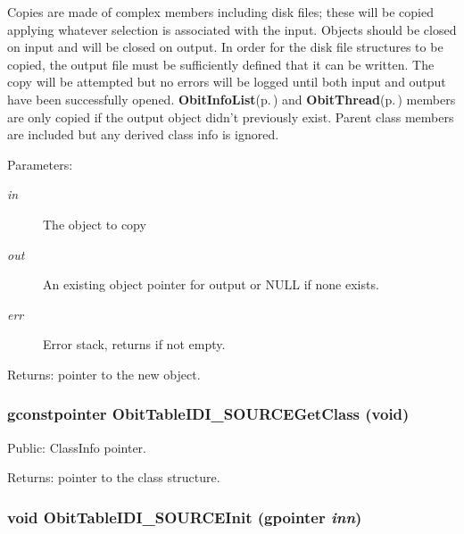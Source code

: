Copies are made of complex members including disk files; these will be copied applying whatever selection is associated with the input. Objects should be closed on input and will be closed on output. In order for the disk file structures to be copied, the output file must be sufficiently defined that it can be written. The copy will be attempted but no errors will be logged until both input and output have been successfully opened. {\bf Obit\-Info\-List}{\rm (p.\,\pageref{structObitInfoList})} and {\bf Obit\-Thread}{\rm (p.\,\pageref{structObitThread})} members are only copied if the output object didn't previously exist. Parent class members are included but any derived class info is ignored. \begin{Desc}
\item[Parameters:]
\begin{description}
\item[{\em in}]The object to copy \item[{\em out}]An existing object pointer for output or NULL if none exists. \item[{\em err}]Error stack, returns if not empty. \end{description}
\end{Desc}
\begin{Desc}
\item[Returns:]pointer to the new object. \end{Desc}
\subsubsection{\setlength{\rightskip}{0pt plus 5cm}gconstpointer Obit\-Table\-IDI\_\-SOURCEGet\-Class (void)}\label{ObitTableIDI__SOURCE_8c_a17}


Public: Class\-Info pointer. 

\begin{Desc}
\item[Returns:]pointer to the class structure. \end{Desc}
\subsubsection{\setlength{\rightskip}{0pt plus 5cm}void Obit\-Table\-IDI\_\-SOURCEInit (gpointer {\em inn})}\label{ObitTableIDI__SOURCE_8c_a8}


